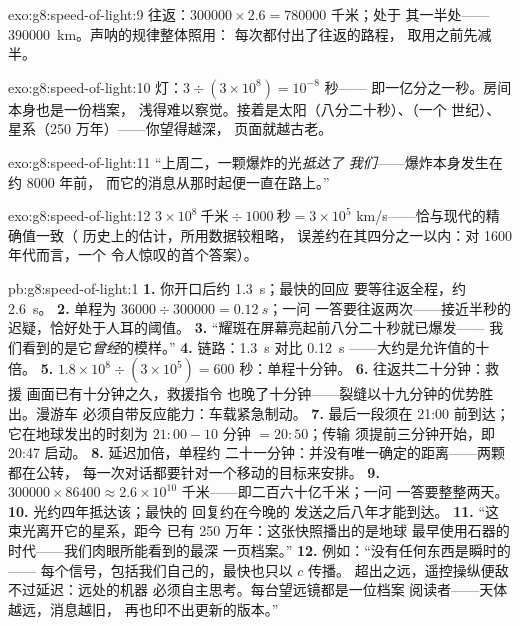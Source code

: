 \begin{solution}{exo:g8:speed-of-light:9}
往返：$300000 \times 2.6 = 780000$ 千米；处于
其一半处——\qty{390000}{km}。声呐的规律整体照用：
每次都付出了往返的路程，
取用之前先减半。
\end{solution}

\begin{solution}{exo:g8:speed-of-light:10}
灯：$3 \div (3 \times 10^{8}) = 10^{-8}$ 秒——
即一亿分之一秒。房间本身也是一份档案，
浅得难以察觉。接着是太阳（八分二十秒）、（一个
世纪）、星系（250 万年）——你望得越深，
页面就越古老。
\end{solution}

\begin{solution}{exo:g8:speed-of-light:11}
“上周二，一颗爆炸的光\emph{抵达了
我们}——爆炸本身发生在约 $8000$ 年前，
而它的消息从那时起便一直在路上。”
\end{solution}

\begin{solution}{exo:g8:speed-of-light:12}
$3 \times 10^{8}\ \text{千米} \div 1000\ \text{秒} = 3 \times
10^{5}$ \unit{km/s}——恰与现代的精确值一致（
历史上的估计，所用数据较粗略，
误差约在其四分之一以内：对 1600 年代而言，一个
令人惊叹的首个答案）。
\end{solution}

\begin{solution}{pb:g8:speed-of-light:1}
\textbf{1.} 你开口后约 \qty{1.3}{s}；最快的回应
要等往返全程，约
\qty{2.6}{s}。
\textbf{2.} 单程为 $36000 \div 300000 = \qty{0.12}{s}$；一问
一答要往返两次——接近半秒的
迟疑，恰好处于人耳的阈值。
\textbf{3.} “耀斑在屏幕亮起前八分二十秒就已爆发——
我们看到的是它\emph{曾经}的模样。”
\textbf{4.} 链路：\qty{1.3}{s} 对比 \qty{0.12}{s}
——大约是允许值的十倍。
\textbf{5.} $1.8 \times 10^{8} \div (3 \times 10^{5}) = 600$
秒：单程十分钟。
\textbf{6.} 往返共二十分钟：救援
画面已有十分钟之久，救援指令
也晚了十分钟——裂缝以十九分钟的优势胜出。漫游车
必须自带反应能力：车载紧急制动。
\textbf{7.} 最后一段须在 21:00 前到达；它在地球发出的时刻为
$21{:}00 - 10$ 分钟 $= 20{:}50$；传输
须提前三分钟开始，即 20:47 启动。
\textbf{8.} 延迟加倍，单程约
二十一分钟：并没有唯一确定的距离——两颗都在公转，
每一次对话都要针对一个移动的目标来安排。
\textbf{9.} $300000 \times 86400 \approx 2.6 \times 10^{10}$
千米——即二百六十亿千米；一问
一答要整整两天。
\textbf{10.} 光约四年抵达该；最快的
回复约在今晚的
发送之后八年才能到达。
\textbf{11.} “这束光离开它的星系，距今
已有 250 万年：这张快照播出的是地球
最早使用石器的时代——我们肉眼所能看到的最深
一页档案。”
\textbf{12.} 例如：“没有任何东西是瞬时的——
每个信号，包括我们自己的，最快也只以 $c$ 传播。
超出之远，遥控操纵便敌不过延迟：远处的机器
必须自主思考。每台望远镜都是一位档案
阅读者——天体越远，消息越旧，
再也印不出更新的版本。”
\end{solution}
